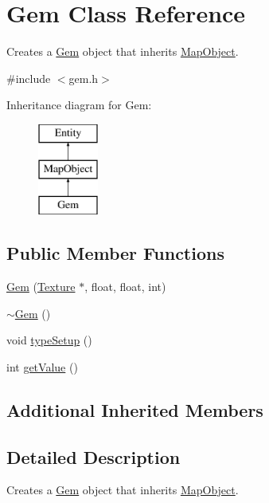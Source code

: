\hypertarget{class_gem}{\section{Gem Class Reference}
\label{class_gem}
}


Creates a \hyperlink{class_gem}{Gem} object that inherits \hyperlink{class_map_object}{Map\+Object}.  




{\ttfamily \#include $<$gem.\+h$>$}

Inheritance diagram for Gem\+:\begin{figure}[H]
\begin{center}
\leavevmode
\includegraphics[height=3.000000cm]{class_gem}
\end{center}
\end{figure}
\subsection*{Public Member Functions}
\begin{DoxyCompactItemize}
\item 
\hyperlink{class_gem_a9b964b4eacf579f4e9fa2e6006222ca4}{Gem} (\hyperlink{class_texture}{Texture} $\ast$, float, float, int)
\item 
\hyperlink{class_gem_a25c24193733a5c4b9c230e4164b08cd4}{$\sim$\+Gem} ()
\item 
void \hyperlink{class_gem_a5b88637e9b62fc71af306f58f5c82cef}{type\+Setup} ()
\item 
int \hyperlink{class_gem_acccf14e79a3e6a9db263081e88e953e1}{get\+Value} ()
\end{DoxyCompactItemize}
\subsection*{Additional Inherited Members}


\subsection{Detailed Description}
Creates a \hyperlink{class_gem}{Gem} object that inherits \hyperlink{class_map_object}{Map\+Object}. 

